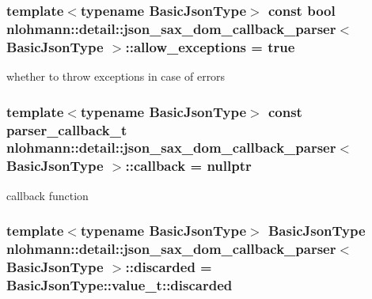 \subsubsection[{\texorpdfstring{allow\+\_\+exceptions}{allow_exceptions}}]{\setlength{\rightskip}{0pt plus 5cm}template$<$typename Basic\+Json\+Type$>$ const bool {\bf nlohmann\+::detail\+::json\+\_\+sax\+\_\+dom\+\_\+callback\+\_\+parser}$<$ Basic\+Json\+Type $>$\+::allow\+\_\+exceptions = true\hspace{0.3cm}{\ttfamily [private]}}\hypertarget{classnlohmann_1_1detail_1_1json__sax__dom__callback__parser_a0a1390c23e2a3da774d75c050f9b3f13}{}\label{classnlohmann_1_1detail_1_1json__sax__dom__callback__parser_a0a1390c23e2a3da774d75c050f9b3f13}


whether to throw exceptions in case of errors 

\subsubsection[{\texorpdfstring{callback}{callback}}]{\setlength{\rightskip}{0pt plus 5cm}template$<$typename Basic\+Json\+Type$>$ const {\bf parser\+\_\+callback\+\_\+t} {\bf nlohmann\+::detail\+::json\+\_\+sax\+\_\+dom\+\_\+callback\+\_\+parser}$<$ Basic\+Json\+Type $>$\+::callback = nullptr\hspace{0.3cm}{\ttfamily [private]}}\hypertarget{classnlohmann_1_1detail_1_1json__sax__dom__callback__parser_a46a72dffd5be4a25602af00f0033c126}{}\label{classnlohmann_1_1detail_1_1json__sax__dom__callback__parser_a46a72dffd5be4a25602af00f0033c126}


callback function 

\subsubsection[{\texorpdfstring{discarded}{discarded}}]{\setlength{\rightskip}{0pt plus 5cm}template$<$typename Basic\+Json\+Type$>$ Basic\+Json\+Type {\bf nlohmann\+::detail\+::json\+\_\+sax\+\_\+dom\+\_\+callback\+\_\+parser}$<$ Basic\+Json\+Type $>$\+::discarded = Basic\+Json\+Type\+::value\+\_\+t\+::discarded\hspace{0.3cm}{\ttfamily [private]}}\hypertarget{classnlohmann_1_1detail_1_1json__sax__dom__callback__parser_a8997ee6dc3bd39116b951465b946445e}{}\label{classnlohmann_1_1detail_1_1json__sax__dom__callback__parser_a8997ee6dc3bd39116b951465b946445e}


